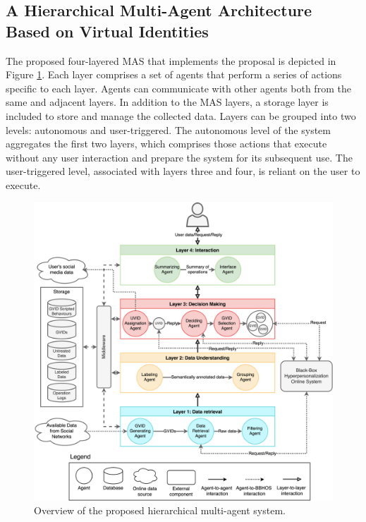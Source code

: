 \subsection{A Hierarchical Multi-Agent Architecture Based on Virtual Identities}\label{6_sec:subsec:mas_description}

The proposed four-layered MAS that implements the proposal is depicted in Figure \ref{fig:overview_mas}. Each layer comprises a set of agents that perform a series of actions specific to each layer. Agents can communicate with other agents both from the same and adjacent layers. In addition to the MAS layers, a storage layer is included to store and manage the collected data. Layers can be grouped into two levels: autonomous and user-triggered. The autonomous level of the system aggregates the first two layers, which comprises those actions that execute without any user interaction and prepare the system for its subsequent use. The user-triggered level, associated with layers three and four, is reliant on the user to execute. 

\begin{figure}[t]
    \centering
    \includegraphics[width=.9\linewidth]{6_kbsextractiondl/figures/Overview_MAS.eps}
    \caption{Overview of the proposed hierarchical multi-agent system.}
    \label{fig:overview_mas}
\end{figure}

